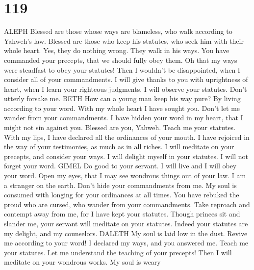 \hypertarget{section-111}{%
\section{119}\label{section-111}}

ALEPH  Blessed are those whose ways are blameless, who
walk according to Yahweh's law.  Blessed are those who
keep his statutes, who seek him with their whole heart. 
Yes, they do nothing wrong. They walk in his ways.  You
have commanded your precepts, that we should fully obey them.
 Oh that my ways were steadfast to obey your statutes!
 Then I wouldn't be disappointed, when I consider all of
your commandments.  I will give thanks to you with
uprightness of heart, when I learn your righteous judgments.
 I will observe your statutes. Don't utterly forsake me.
BETH  How can a young man keep his way pure? By living
according to your word.  With my whole heart I have
sought you. Don't let me wander from your commandments. 
I have hidden your word in my heart, that I might not sin against you.
 Blessed are you, Yahweh. Teach me your statutes.
 With my lips, I have declared all the ordinances of your
mouth.  I have rejoiced in the way of your testimonies,
as much as in all riches.  I will meditate on your
precepts, and consider your ways.  I will delight myself
in your statutes. I will not forget your word. GIMEL  Do
good to your servant. I will live and I will obey your word.
 Open my eyes, that I may see wondrous things out of your
law.  I am a stranger on the earth. Don't hide your
commandments from me.  My soul is consumed with longing
for your ordinances at all times.  You have rebuked the
proud who are cursed, who wander from your commandments. 
Take reproach and contempt away from me, for I have kept your statutes.
 Though princes sit and slander me, your servant will
meditate on your statutes.  Indeed your statutes are my
delight, and my counselors. DALETH  My soul is laid low
in the dust. Revive me according to your word!  I
declared my ways, and you answered me. Teach me your statutes.
 Let me understand the teaching of your precepts! Then I
will meditate on your wondrous works.  My soul is weary
